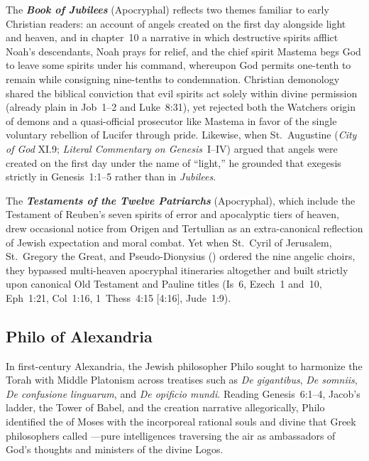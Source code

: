 The \textbf{\emph{Book of Jubilees}} (Apocryphal) reflects two themes familiar to early Christian readers: an account of angels created on the first day alongside light and heaven, and in chapter~10 a narrative in which destructive spirits afflict Noah's descendants, Noah prays for relief, and the chief spirit Mastema begs God to leave some spirits under his command, whereupon God permits one-tenth to remain while consigning nine-tenths to condemnation. Christian demonology shared the biblical conviction that evil spirits act solely within divine permission (already plain in Job~1--2 and Luke~8:31), yet rejected both the Watchers origin of demons and a quasi-official prosecutor like Mastema in favor of the single voluntary rebellion of Lucifer through pride. Likewise, when St.~Augustine (\emph{City of God} XI.9; \emph{Literal Commentary on Genesis}~I--IV) argued that angels were created on the first day under the name of ``light,'' he grounded that exegesis strictly in Genesis~1:1--5 rather than in \emph{Jubilees}.

The \textbf{\emph{Testaments of the Twelve Patriarchs}} (Apocryphal), which include the Testament of Reuben's seven spirits of error and apocalyptic tiers of heaven, drew occasional notice from Origen and Tertullian as an extra-canonical reflection of Jewish expectation and moral combat. Yet when St.~Cyril of Jerusalem, St.~Gregory the Great, and Pseudo-Dionysius () ordered the nine angelic choirs, they bypassed multi-heaven apocryphal itineraries altogether and built strictly upon canonical Old Testament and Pauline titles (Is~6, Ezech~1 and~10, Eph~1:21, Col~1:16, 1~Thess~4:15 [4:16], Jude~1:9).

\subsection{Philo of Alexandria}
\label{subsec:philo}

In first-century Alexandria, the Jewish philosopher Philo sought to harmonize the Torah with Middle Platonism across treatises such as \emph{De gigantibus}, \emph{De somniis}, \emph{De confusione linguarum}, and \emph{De opificio mundi}. Reading Genesis~6:1--4, Jacob's ladder, the Tower of Babel, and the creation narrative allegorically, Philo identified the  of Moses with the incorporeal rational souls and divine  that Greek philosophers called ---pure intelligences traversing the air as ambassadors of God's thoughts and ministers of the divine Logos.

